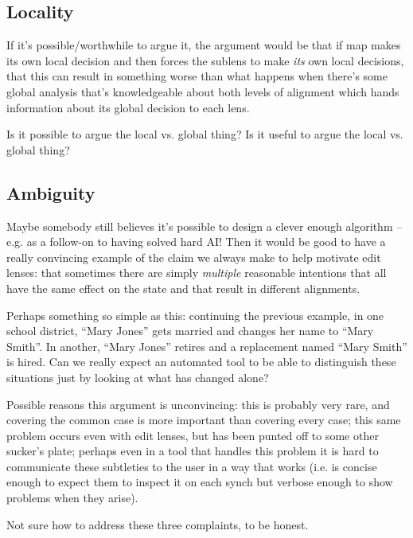 \subsection{Locality}
If it's possible/worthwhile to argue it, the argument would be that if map
makes its own local decision and then forces the sublens to make \emph{its}
own local decisions, that this can result in something worse than what
happens when there's some global analysis that's knowledgeable about both
levels of alignment which hands information about its global decision to
each lens.

Is it possible to argue the local vs. global thing? Is it useful to argue
the local vs. global thing?

\subsection{Ambiguity}
Maybe somebody still believes it's possible to design a clever enough
algorithm -- e.g. as a follow-on to having solved hard AI! Then it would be
good to have a really convincing example of the claim we always make to help
motivate edit lenses: that sometimes there are simply \emph{multiple}
reasonable intentions that all have the same effect on the state and that
result in different alignments.

Perhaps something so simple as this: continuing the previous example, in one
school district, ``Mary Jones'' gets married and changes her name to ``Mary
Smith''. In another, ``Mary Jones'' retires and a replacement named ``Mary
Smith'' is hired. Can we really expect an automated tool to be able to
distinguish these situations just by looking at what has changed alone?

Possible reasons this argument is unconvincing: this is probably very rare,
and covering the common case is more important than covering every case;
this same problem occurs even with edit lenses, but has been punted off to
some other sucker's plate; perhaps even in a tool that handles this problem
it is hard to communicate these subtleties to the user in a way that works
(i.e. is concise enough to expect them to inspect it on each synch but
verbose enough to show problems when they arise).

Not sure how to address these three complaints, to be honest.
